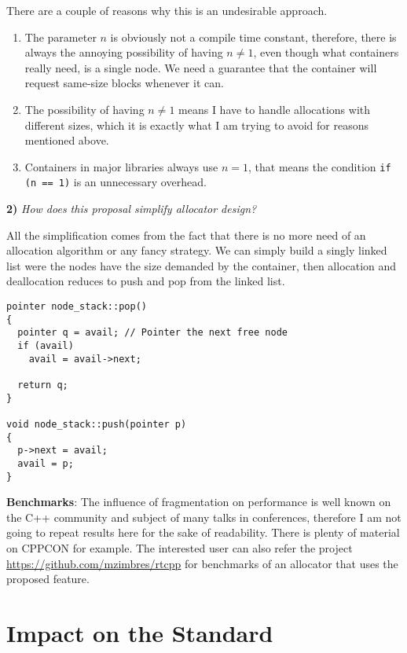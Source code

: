 \documentclass[11pt]{article}
\begin{document}
\noindent
There are a couple of reasons why this is an undesirable approach.

\begin{enumerate}
\item The parameter $n$ is obviously not a compile time constant,
therefore, there is always the annoying possibility of having
$n \ne 1$, even though what containers really need, is a single
node. We need a guarantee that the container will request
same-size blocks whenever it can.

\item The possibility of having $n \ne 1$ means I have to handle
allocations with different sizes, which it is exactly what I am
trying to avoid for reasons mentioned above.

\item Containers in major libraries always use $n = 1$, that
means the condition \texttt{if (n == 1)} is an unnecessary
overhead.
\end{enumerate}

\medskip
\noindent
{\bf 2) }{\it How does this proposal simplify allocator design?}

\medskip
\noindent
All the simplification comes from the fact that there is no more
need of an allocation algorithm or any fancy strategy. We can simply
build a singly linked list were the nodes have the size demanded
by the container, then allocation and deallocation reduces to
push and pop from the linked list.

\begin{lstlisting}
pointer node_stack::pop()
{
  pointer q = avail; // Pointer the next free node
  if (avail)
    avail = avail->next;

  return q;
}

void node_stack::push(pointer p)
{
  p->next = avail;
  avail = p;
}

\end{lstlisting}

\medskip
\noindent
{\bf Benchmarks}: The influence of fragmentation on performance
is well known on the C++ community and subject of many talks in
conferences, therefore I am not going to repeat results here for
the sake of readability. There is plenty of material on CPPCON
for example.  The interested user can also refer the project
\href{https://github.com/mzimbres/rtcpp}{https://github.com/mzimbres/rtcpp}
for benchmarks of an allocator that uses the proposed feature.

\section{Impact on the Standard}
\end{document}
